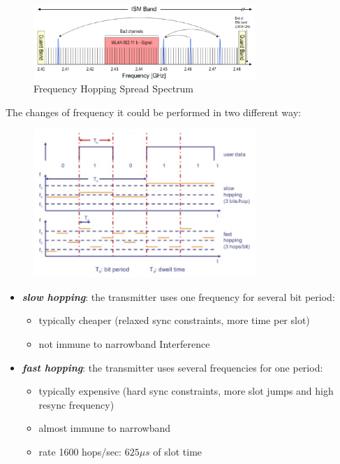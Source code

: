 \begin{figure}[h]
    \centering
    \includegraphics[width=0.75\textwidth]{img/ble_fhss}
    \caption{Frequency Hopping Spread Spectrum}
\end{figure}
The changes of frequency it could be performed in two different way:

\begin{figure}[h]
    \centering
    \includegraphics[width=0.75\textwidth]{img/ble_hop}
\end{figure}
\begin{itemize}[nosep]
    
    \item \textbf{\textit{slow hopping}}: the transmitter uses one frequency for several bit period:
    \begin{itemize}[nosep]
        \item typically cheaper (relaxed sync constraints, more time per slot)
        \item not immune to narrowband Interference
    \end{itemize}
    
    \item \textbf{\textit{fast hopping}}: the transmitter uses several frequencies for one period:
    \begin{itemize}[nosep]
        \item typically expensive (hard sync constraints, more slot jumps and high resync frequency)
        \item almost immune to narrowband
        \item rate 1600 hops/sec: $625 \mu s$ of slot time
    \end{itemize}

\end{itemize}
